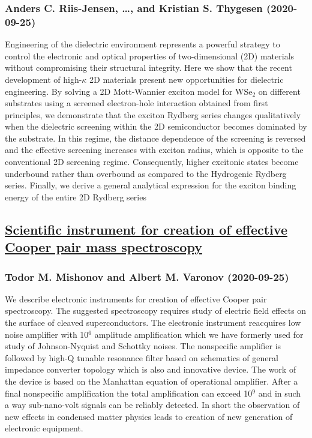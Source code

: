 \subsubsection*{Anders C. Riis-Jensen, \dots, and Kristian S. Thygesen (2020-09-25)}
Engineering of the dielectric environment represents a powerful strategy to
control the electronic and optical properties of two-dimensional (2D) materials
without compromising their structural integrity. Here we show that the recent
development of high-$\kappa$ 2D materials present new opportunities for
dielectric engineering. By solving a 2D Mott-Wannier exciton model for WSe$_2$
on different substrates using a screened electron-hole interaction obtained
from first principles, we demonstrate that the exciton Rydberg series changes
qualitatively when the dielectric screening within the 2D semiconductor becomes
dominated by the substrate. In this regime, the distance dependence of the
screening is reversed and the effective screening increases with exciton
radius, which is opposite to the conventional 2D screening regime.
Consequently, higher excitonic states become underbound rather than overbound
as compared to the Hydrogenic Rydberg series. Finally, we derive a general
analytical expression for the exciton binding energy of the entire 2D Rydberg
series

\subsection*{\href{http://arxiv.org/abs/2009.12315v1}{Scientific instrument for creation of effective Cooper pair mass  spectroscopy}}
\subsubsection*{Todor M. Mishonov and Albert M. Varonov (2020-09-25)}
We describe electronic instruments for creation of effective Cooper pair
spectroscopy. The suggested spectroscopy requires study of electric field
effects on the surface of cleaved superconductors. The electronic instrument
reacquires low noise amplifier with 10$^6$ amplitude amplification which we
have formerly used for study of Johnson-Nyquist and Schottky noises. The
nonspecific amplifier is followed by high-Q tunable resonance filter based on
schematics of general impedance converter topology which is also and innovative
device. The work of the device is based on the Manhattan equation of
operational amplifier. After a final nonspecific amplification the total
amplification can exceed 10$^9$ and in such a way sub-nano-volt signals can be
reliably detected. In short the observation of new effects in condensed matter
physics leads to creation of new generation of electronic equipment.

